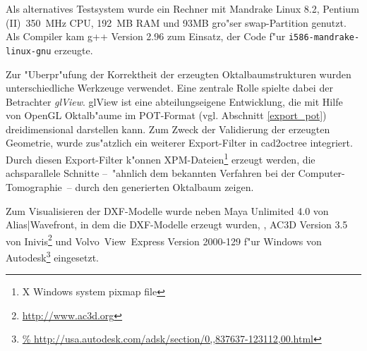 Als alternatives Testsystem wurde ein Rechner mit Mandrake Linux 8.2, 
Pentium (II)~350~MHz CPU, 192~MB RAM und 93MB gro"ser swap-Partition genutzt. 
Als Compiler kam g++ Version 2.96 zum Einsatz, der Code f"ur 
\texttt{i586-mandrake-linux-gnu} erzeugte.

Zur "Uberpr"ufung der Korrektheit der erzeugten Oktalbaumstrukturen wurden 
unterschiedliche Werkzeuge verwendet. Eine zentrale Rolle spielte dabei  
der Betrachter \emph{glView}. glView ist eine abteilungseigene 
Entwicklung, die mit Hilfe von OpenGL Oktalb"aume im POT-Format (vgl. 
Abschnitt \ref{export_pot}) 
dreidimensional darstellen kann. Zum Zweck der Validierung der erzeugten 
Geometrie, wurde zus"atzlich ein weiterer Export-Filter in cad2octree 
integriert. Durch diesen Export-Filter k"onnen 
XPM-Dateien\footnote{X Windows system pixmap file} erzeugt werden, die 
achsparallele Schnitte --~"ahnlich dem bekannten Verfahren bei der 
Computer-Tomographie~-- durch den generierten Oktalbaum zeigen. 

Zum Visualisieren der DXF-Modelle wurde neben Maya Unlimited 4.0 von 
Alias|Wavefront, in dem die DXF-Modelle erzeugt wurden, \cite{dxfview}, AC3D 
Version 3.5 von Inivis\footnote{\url{http://www.ac3d.org}} und 
Volvo~View~Express Version 2000-129 f"ur Windows von Autodesk\footnote{\url{%
http://usa.autodesk.com/adsk/section/0,,837637-123112,00.html}} eingesetzt.






